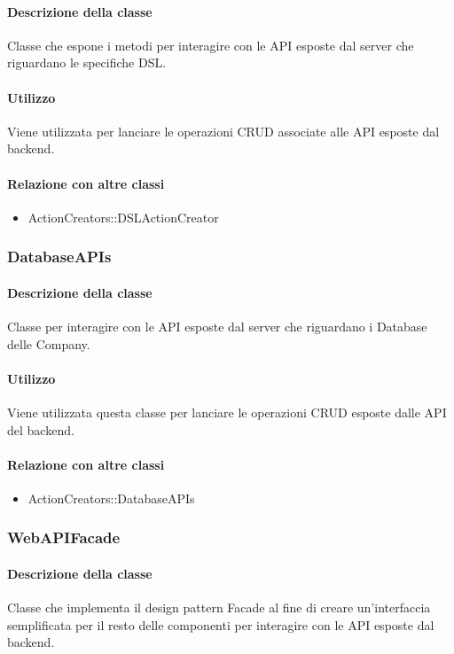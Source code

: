 \paragraph*{Descrizione della classe}
Classe che espone i metodi per interagire con le API esposte dal server che riguardano le specifiche DSL.

\paragraph*{Utilizzo}
Viene utilizzata per lanciare le operazioni CRUD associate alle API esposte dal backend.

\paragraph*{Relazione con altre classi}
\begin{itemize}
\item ActionCreators::DSLActionCreator
\end{itemize}

\subsubsection{DatabaseAPIs}
\paragraph*{Descrizione della classe}
Classe per interagire con le API esposte dal server che riguardano i Database delle Company.

\paragraph*{Utilizzo}
Viene utilizzata questa classe per lanciare le operazioni CRUD esposte dalle API del backend.

\paragraph*{Relazione con altre classi}
\begin{itemize}
\item ActionCreators::DatabaseAPIs
\end{itemize}

\subsubsection{WebAPIFacade}
\paragraph*{Descrizione della classe}
Classe che implementa il design pattern Facade al fine di creare un'interfaccia semplificata per il resto delle componenti per interagire con le API esposte dal backend.
